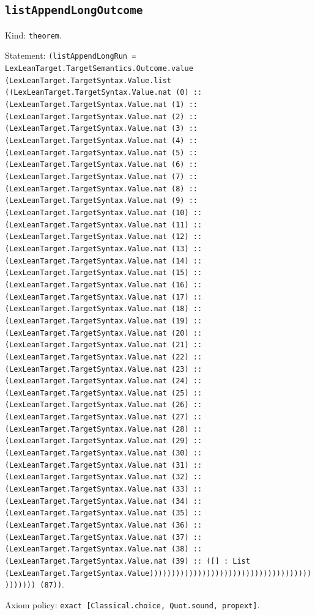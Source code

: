 \documentclass[11pt]{article}
\begin{document}
\subsection*{\texttt{listAppendLongOutcome}}
\noindent Kind: \texttt{theorem}.\par
\noindent Statement: \texttt{(listAppendLongRun = LexLeanTarget.TargetSemantics.Outcome.value (LexLeanTarget.TargetSyntax.Value.list ((LexLeanTarget.TargetSyntax.Value.nat (0) :: (LexLeanTarget.TargetSyntax.Value.nat (1) :: (LexLeanTarget.TargetSyntax.Value.nat (2) :: (LexLeanTarget.TargetSyntax.Value.nat (3) :: (LexLeanTarget.TargetSyntax.Value.nat (4) :: (LexLeanTarget.TargetSyntax.Value.nat (5) :: (LexLeanTarget.TargetSyntax.Value.nat (6) :: (LexLeanTarget.TargetSyntax.Value.nat (7) :: (LexLeanTarget.TargetSyntax.Value.nat (8) :: (LexLeanTarget.TargetSyntax.Value.nat (9) :: (LexLeanTarget.TargetSyntax.Value.nat (10) :: (LexLeanTarget.TargetSyntax.Value.nat (11) :: (LexLeanTarget.TargetSyntax.Value.nat (12) :: (LexLeanTarget.TargetSyntax.Value.nat (13) :: (LexLeanTarget.TargetSyntax.Value.nat (14) :: (LexLeanTarget.TargetSyntax.Value.nat (15) :: (LexLeanTarget.TargetSyntax.Value.nat (16) :: (LexLeanTarget.TargetSyntax.Value.nat (17) :: (LexLeanTarget.TargetSyntax.Value.nat (18) :: (LexLeanTarget.TargetSyntax.Value.nat (19) :: (LexLeanTarget.TargetSyntax.Value.nat (20) :: (LexLeanTarget.TargetSyntax.Value.nat (21) :: (LexLeanTarget.TargetSyntax.Value.nat (22) :: (LexLeanTarget.TargetSyntax.Value.nat (23) :: (LexLeanTarget.TargetSyntax.Value.nat (24) :: (LexLeanTarget.TargetSyntax.Value.nat (25) :: (LexLeanTarget.TargetSyntax.Value.nat (26) :: (LexLeanTarget.TargetSyntax.Value.nat (27) :: (LexLeanTarget.TargetSyntax.Value.nat (28) :: (LexLeanTarget.TargetSyntax.Value.nat (29) :: (LexLeanTarget.TargetSyntax.Value.nat (30) :: (LexLeanTarget.TargetSyntax.Value.nat (31) :: (LexLeanTarget.TargetSyntax.Value.nat (32) :: (LexLeanTarget.TargetSyntax.Value.nat (33) :: (LexLeanTarget.TargetSyntax.Value.nat (34) :: (LexLeanTarget.TargetSyntax.Value.nat (35) :: (LexLeanTarget.TargetSyntax.Value.nat (36) :: (LexLeanTarget.TargetSyntax.Value.nat (37) :: (LexLeanTarget.TargetSyntax.Value.nat (38) :: (LexLeanTarget.TargetSyntax.Value.nat (39) :: ([] : List (LexLeanTarget.TargetSyntax.Value)))))))))))))))))))))))))))))))))))))))))))) (87))}.\par
\noindent Axiom policy: \texttt{exact [Classical.choice, Quot.sound, propext]}.\par
\end{document}
